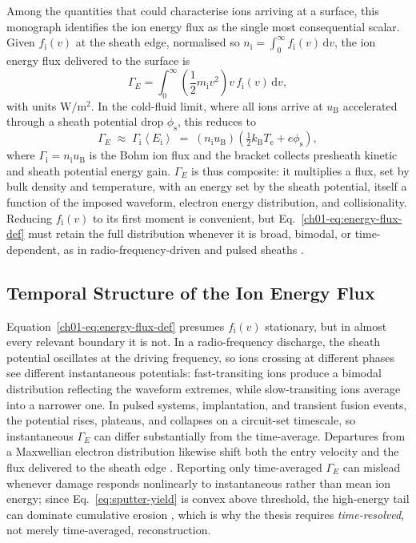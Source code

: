 Among the quantities that could characterise ions arriving at a surface, this monograph identifies the ion energy flux as the single most consequential scalar. Given $f_{\mathrm{i}}(v)$ at the sheath edge, normalised so $n_{\mathrm{i}} = \int_0^\infty f_{\mathrm{i}}(v)\,\mathrm{d}v$, the ion energy flux delivered to the surface is
\begin{equation}
\Gamma_{E} = \int_{0}^{\infty} \left(\frac{1}{2} m_{\mathrm{i}} v^{2}\right) v\, f_{\mathrm{i}}(v)\,\mathrm{d}v,
\label{ch01-eq:energy-flux-def}
\end{equation}
with units $\si{\watt\per\meter\squared}$. In the cold-fluid limit, where all ions arrive at $u_{\mathrm{B}}$ accelerated through a sheath potential drop $\phi_{\mathrm{s}}$, this reduces to
\begin{equation}
\Gamma_{E} \;\approx\; \Gamma_{\mathrm{i}} \left\langle E_{\mathrm{i}} \right\rangle
\;=\; \left(n_{\mathrm{i}} u_{\mathrm{B}}\right)\left(\tfrac{1}{2} k_{\mathrm{B}} T_{\mathrm{e}} + e\phi_{\mathrm{s}}\right),
\label{eq:energy-flux-approx}
\end{equation}
where $\Gamma_{\mathrm{i}} = n_{\mathrm{i}} u_{\mathrm{B}}$ is the Bohm ion flux and the bracket collects presheath kinetic and sheath potential energy gain. $\Gamma_E$ is thus composite: it multiplies a flux, set by bulk density and temperature, with an energy set by the sheath potential, itself a function of the imposed waveform, electron energy distribution, and collisionality. Reducing $f_{\mathrm{i}}(v)$ to its first moment is convenient, but Eq.~\eqref{ch01-eq:energy-flux-def} must retain the full distribution whenever it is broad, bimodal, or time-dependent, as in radio-frequency-driven and pulsed sheaths \cite{ref0105}.

\subsection{Temporal Structure of the Ion Energy Flux}

Equation~\eqref{ch01-eq:energy-flux-def} presumes $f_{\mathrm{i}}(v)$ stationary, but in almost every relevant boundary it is not. In a radio-frequency discharge, the sheath potential oscillates at the driving frequency, so ions crossing at different phases see different instantaneous potentials: fast-transiting ions produce a bimodal distribution reflecting the waveform extremes, while slow-transiting ions average into a narrower one. In pulsed systems, implantation, and transient fusion events, the potential rises, plateaus, and collapses on a circuit-set timescale, so instantaneous $\Gamma_E$ can differ substantially from the time-average. Departures from a Maxwellian electron distribution likewise shift both the entry velocity and the flux delivered to the sheath edge \cite{ref0090}. Reporting only time-averaged $\Gamma_E$ can mislead whenever damage responds nonlinearly to instantaneous rather than mean ion energy; since Eq.~\eqref{eq:sputter-yield} is convex above threshold, the high-energy tail can dominate cumulative erosion \cite{ref0096}, which is why the thesis requires \emph{time-resolved}, not merely time-averaged, reconstruction.

